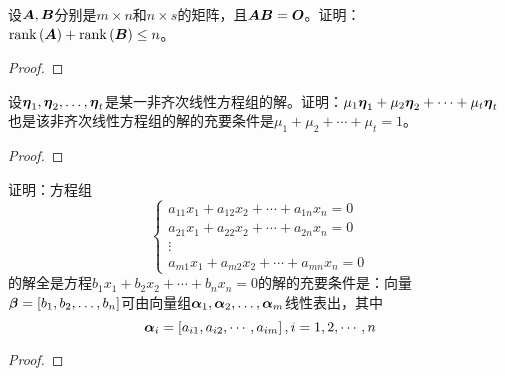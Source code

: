 \begin{problem}\label{problem-2.36}
设\(\boldsymbol{A},\boldsymbol{B}\)分别是\(m\times n\)和\(n\times s\)的矩阵，且\(\boldsymbol{A}\boldsymbol{B}=\boldsymbol{O}\)。证明：\(\mathrm{rank}\left( \boldsymbol{A} \right)+\mathrm{rank}\left( \boldsymbol{B} \right)\le n\)。
\end{problem}
\begin{proof}

\end{proof}

\begin{problem}\label{problem-2.37}
设\({\boldsymbol{\eta}}_1,{\boldsymbol{\eta}}_2,\dots,{\boldsymbol{\eta}}_{t}\)是某一非齐次线性方程组的解。证明：\(\mu_1\boldsymbol{\eta}_1+\mu_2\boldsymbol{\eta}_2+\cdots+\mu_t\boldsymbol{\eta}_t\)也是该非齐次线性方程组的解的充要条件是\(\mu_1+\mu_2+\cdots+\mu_t=1\)。
\end{problem}
\begin{proof}
\end{proof}

\begin{problem}\label{problem-2.38}
证明：方程组
\begin{equation*}
    \begin{cases}
        a_{11}x_1+a_{12}x_2+\cdots+a_{1n}x_n=0 \\
        a_{21}x_1+a_{22}x_2+\cdots+a_{2n}x_n=0 \\
        \vdots                                 \\
        a_{m1}x_1+a_{m2}x_2+\cdots+a_{mn}x_n=0
    \end{cases}
\end{equation*}
的解全是方程\(b_1x_1+b_2x_2+\cdots+b_nx_n=0\)的解的充要条件是：向量\(\boldsymbol{\beta}=\left[ {b}_1,{b}_2,\dots,{b}_{n} \right]\)可由向量组\({\boldsymbol{\alpha}}_1,{\boldsymbol{\alpha}}_2,\dots,{\boldsymbol{\alpha}}_{m}\)线性表出，其中
\begin{equation*}
    \boldsymbol{\alpha}_i=\left[ a_{i1},a_{i2},\cdots,a_{im} \right],i=1,2,\cdots,n
\end{equation*}
\end{problem}
\begin{proof}
\end{proof}

